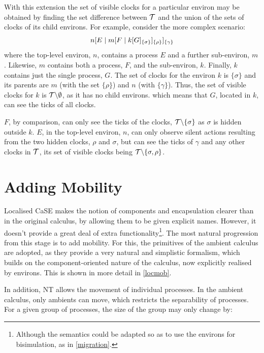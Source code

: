 With this extension the set of visible clocks for a particular environ
may be obtained by finding the set difference between $\text{$\mathcal{T}$}$ and
the union of the sets of clocks of its child environs.  For example,
consider the more complex scenario:
\begin{equation}
{n}[ E\;|\;{m}[ F\;|\;{k}[ G ]_{\{\sigma\}} ]_{\{\rho\}} ]_{\{\gamma\}}
\end{equation}
where the top-level environ, $n$, contains a process $E$ and a further
sub-environ, $m$.  Likewise, $m$ contains both a process, $F$, and the
sub-environ, $k$.  Finally, $k$ contains just the single process, $G$.
The set of clocks for the environ $k$ is $\{\sigma\}$ and its parents
are $m$ (with the set $\{\rho\}$) and $n$ (with $\{\gamma\}$).  Thus,
the set of visible clocks for $k$ is $\text{$\mathcal{T}$} \backslash \emptyset$,
as it has no child environs.  which means that $G$, located in $k$,
can see the ticks of all clocks.

$F$, by comparison, can only see the ticks of the clocks, $\text{$\mathcal{T}$}
\backslash \{\sigma\}$ as $\sigma$ is hidden outside $k$.  $E$, in the
top-level environ, $n$, can only observe silent actions resulting from
the two hidden clocks, $\rho$ and $\sigma$, but can see the ticks of
$\gamma$ and any other clocks in $\text{$\mathcal{T}$}$, its set of visible clocks
being $\text{$\mathcal{T}$} \backslash \{\sigma, \rho\}$.

\section{Adding Mobility}
\label{addingmob}

Localised CaSE makes the notion of components and encapsulation clearer
than in the original calculus, by allowing them to be given explicit
names.  However, it doesn't provide a great deal of extra
functionality\footnote{Although the semantics could be adapted so as to
use the environs for bisimulation, as in \ref{migration}.}.  The most
natural progression from this stage is to add mobility.  For this, the
primitives of the ambient calculus are adopted, as they provide a very
natural and simplistic formalism, which builds on the component-oriented
nature of the calculus, now explicitly realised by environs.  This is
shown in more detail in \ref{locmob}.

In addition, NT allows the movement of individual processes.  In the
ambient calculus, only ambients can move, which restricts the
separability of processes.  For a given group of processes, the
size of the group may only change by:

